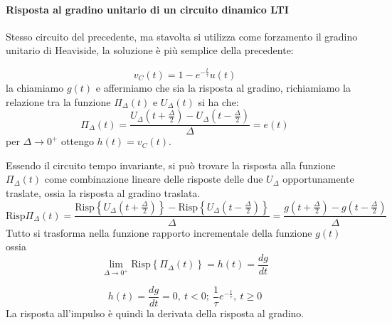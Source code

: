 \paragraph{Risposta al gradino unitario di un circuito dinamico LTI}
Stesso circuito del precedente, ma stavolta si utilizza come forzamento il gradino unitario di
Heaviside, la soluzione è più semplice della precedente:

$$
v_C(t) = 1-e^{-\frac{t}{\tau}}u(t)
$$
la chiamiamo $g(t)$ e affermiamo che sia la risposta al gradino, richiamiamo la relazione
tra la funzione $\Pi_\Delta(t)$ e $U_\Delta(t)$ si ha che:
$$
\Pi_\Delta(t) = \frac{U_\Delta\left(t+\frac{\Delta}{2}\right)-U_\Delta\left(t-\frac{\Delta}{2}\right)}{\Delta} = e(t)
$$
per $\Delta \rightarrow 0^+$ ottengo $h(t) = v_C(t)$.

Essendo il circuito tempo invariante, si può trovare la risposta alla funzione $\Pi_\Delta(t)$
come combinazione lineare delle risposte delle due $U_\Delta$ opportunamente traslate, ossia
la risposta al gradino traslata.
$$
\text{Risp} \Pi_\Delta(t) = \frac{\text{Risp}\left\{U_\Delta\left(t+\frac{\Delta}{2}\right)\right\} - 
\text{Risp}\left\{U_\Delta\left(t-\frac{\Delta}{2}\right)\right\}}{\Delta} = 
\frac{g\left(t+\frac{\Delta}{2}\right) - g\left(t-\frac{\Delta}{2}\right)}{\Delta}
$$
Tutto si trasforma nella funzione rapporto incrementale della funzione $g(t)$ ossia
$$
\lim_{\Delta\rightarrow0^+}\text{Risp}\left\{\Pi_\Delta(t)\right\} = h(t) = \frac{dg}{dt}
$$

$$
h(t) = \frac{dg}{dt} = 0,\ t < 0;\ \frac{1}{\tau}e^{-\frac{t}{\tau}},\ t\geq0 
$$
La risposta all'impulso è quindi la derivata della risposta al gradino.
